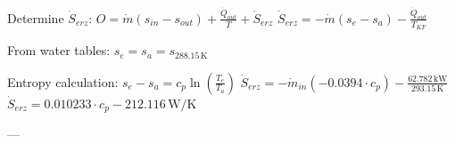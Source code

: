 Determine \( \dot{S}_{erz} \):  
\( O = \dot{m} (s_{in} - s_{out}) + \frac{\dot{Q}_{out}}{T} + \dot{S}_{erz} \)  
\( \dot{S}_{erz} = -\dot{m} (s_{e} - s_{a}) - \frac{\dot{Q}_{out}}{T_{KF}} \)  

From water tables:  
\( s_{e} = s_{a} = s_{288.15 \, \text{K}} \)  

Entropy calculation:  
\( s_{e} - s_{a} = c_p \ln \left( \frac{T_e}{T_a} \right) \)  
\( \dot{S}_{erz} = -\dot{m}_{in} (-0.0394 \cdot c_p) - \frac{62.782 \, \text{kW}}{293.15 \, \text{K}} \)  
\( \dot{S}_{erz} = 0.010233 \cdot c_p - 212.116 \, \text{W/K} \)  

---